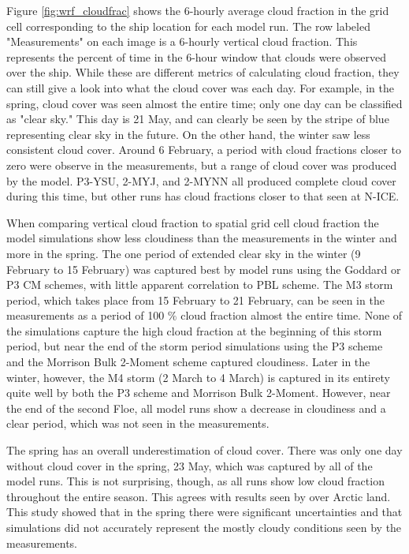Figure \ref{fig:wrf_cloudfrac} shows the 6-hourly average cloud fraction in the grid cell corresponding to the ship location for each model run. The row labeled "Measurements" on each image is a 6-hourly vertical cloud fraction. This represents the percent of time in the 6-hour window that clouds were observed over the ship. While these are different metrics of calculating cloud fraction, they can still give a look into what the cloud cover was each day. For example, in the spring, cloud cover was seen almost the entire time; only one day can be classified as "clear sky." This day is 21 May, and can clearly be seen by the stripe of blue representing clear sky in the future. On the other hand, the winter saw less consistent cloud cover. Around 6 February, a period with cloud fractions closer to zero were observe in the measurements, but a range of cloud cover was produced by the model. P3-YSU, 2-MYJ, and 2-MYNN all produced complete cloud cover during this time, but other runs has cloud fractions closer to that seen at N-ICE. 

When comparing vertical cloud fraction to spatial grid cell cloud fraction the model simulations show less cloudiness than the measurements in the winter and more in the spring. The one period of extended clear sky in the winter (9 February to 15 February) was captured best by model runs using the Goddard or P3 CM schemes, with little apparent correlation to PBL scheme. The M3 storm period, which takes place from 15 February to 21 February, can be seen in the measurements as a period of 100 $\%$ cloud fraction almost the entire time. None of the simulations capture the high cloud fraction at the beginning of this storm period, but near the end of the storm period simulations using the P3 scheme and the Morrison Bulk 2-Moment scheme captured cloudiness. Later in the winter, however, the M4 storm (2 March to 4 March) is captured in its entirety quite well by both the P3 scheme and Morrison Bulk 2-Moment. However, near the end of the second Floe, all model runs show a decrease in cloudiness and a clear period, which was not seen in the measurements. 

The spring has an overall underestimation of cloud cover. There was only one day without cloud cover in the spring, 23 May, which was captured by all of the model runs. This is not surprising, though, as all runs show low cloud fraction throughout the entire season. This agrees with results seen by \citet{hines:2011} over Arctic land. This study showed that in the spring there were significant uncertainties and that simulations did not accurately represent the mostly cloudy conditions seen by the measurements. 

